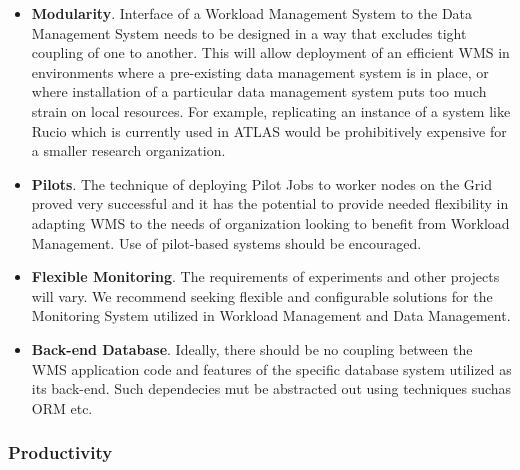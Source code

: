 \begin{itemize}

\item \textbf{Modularity}. Interface of a Workload Management System to the Data Management System needs to be designed in a way that
excludes tight coupling of one to another. This will allow deployment of an efficient WMS in environments where a pre-existing data management  system
is in place, or where installation of a particular data management system puts too much strain on local resources. For example, replicating an instance
of a system like Rucio which is currently used in ATLAS would be prohibitively expensive for a smaller research organization.

\item \textbf{Pilots}. The technique of deploying Pilot Jobs to worker nodes on the Grid proved very successful and it has the potential to provide needed
flexibility in adapting WMS to the needs of organization looking to benefit from Workload Management. Use of pilot-based systems should be encouraged.

\item \textbf{Flexible Monitoring}. The requirements of experiments and other projects will vary. We recommend seeking flexible and configurable solutions
for the Monitoring System utilized in Workload Management and Data Management.

\item \textbf{Back-end Database}. Ideally, there should be no coupling between the WMS application code and features of the specific database system
utilized as its back-end. Such dependecies mut be abstracted out using techniques suchas ORM etc.

\end{itemize}

\subsubsection{Productivity}

